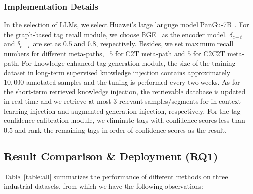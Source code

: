 \subsubsection{Implementation Details} 
In the selection of LLMs, we select Huawei's large languge model PanGu-7B~\cite{zeng2021pangu,wang2023pangu}.
For the graph-based tag recall module, we choose BGE~\cite{bge} as the encoder model. $\delta_{c-t}$ and $\delta_{c-c}$ are set as $0.5$ and $0.8$, respectively. Besides, we set maximum recall numbers for different meta-paths, $15$ for C2T meta-path and $5$ for C2C2T meta-path.
For knowledge-enhanced tag generation module, the size of the training dataset in long-term supervised knowledge injection contains approximately $10,000$ annotated samples and the tuning is performed every two weeks. As for the short-term retrieved knowledge injection, the retrievable database is updated in real-time and we retrieve at most $3$ relevant samples/segments for in-context learning injection and augmented generation injection, respectively.
For the tag confidence calibration module, we eliminate tags with confidence scores less than $0.5$ and rank the remaining tags in order of confidence scores as the result.











\subsection{Result Comparison \& Deployment (RQ1)}
Table~\ref{table:all}  summarizes the performance of different methods on three industrial datasets, from which we have the following observations:

